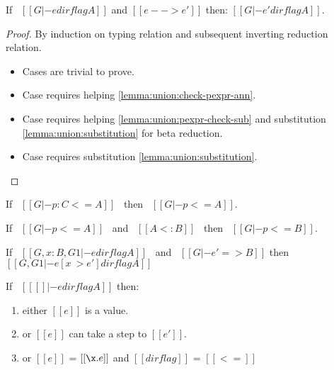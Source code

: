 \begin{lemma}
\label{lemma:union:preservation}
  If \ $[[G |- e dirflag A]]$ and $[[e --> e']]$ then: $[[G |- e' dirflag A]]$.
\end{lemma}

\begin{proof}
  By induction on typing relation and subsequent inverting reduction relation.
  \begin{itemize}
    \item Cases  are trivial to prove.
    \item Case  requires helping \cref{lemma:union:check-pexpr-ann}.
    \item Case  requires helping \cref{lemma:union:pexpr-check-sub}
          and substitution \cref{lemma:union:substitution} for beta reduction.
    \item Case  requires substitution \cref{lemma:union:substitution}.
  \end{itemize}
\end{proof}


\begin{lemma}
\label{lemma:union:check-pexpr-ann}
  If \ $[[G |- p:C <= A]]$ \ then \ $[[G |- p <= A]]$.
\end{lemma}

\begin{lemma}
\label{lemma:union:pexpr-check-sub}
  If \ $[[G |- p <= A]]$ \ and \ $[[A <: B]]$ \ then \ $[[G |- p <= B]]$.
\end{lemma}

\begin{lemma}[Substitution]
\label{lemma:union:substitution}
  If \ $[[G, x:B , G1 |- e dirflag A]]$ \ and \ $[[G |- e' => B]]$
  then \ $[[G, G1 |- e [ x ~> e' ] dirflag A]]$
\end{lemma}

\begin{lemma}[Progress]
\label{lemma:union:progress}
If \ $[[ [] |- e dirflag A]]$ then:
 \begin{enumerate}
  \item either $[[e]]$ is a value.
  \item or $[[e]]$ can take a step to $[[e']]$.
  \item or $[[e]]$ = $[[\x.e]]$ and $[[dirflag]]$ = $[[<=]]$
  \end{enumerate}
\end{lemma}


